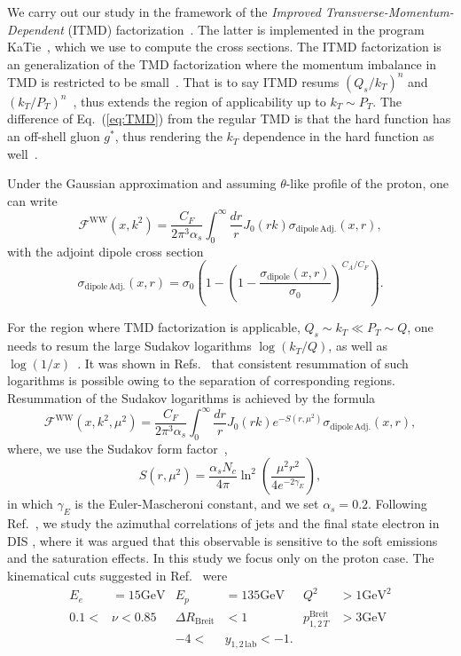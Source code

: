 \documentclass[11pt]{article}
\newcommand{\fww}[0]{\mathcal{F}^{\mathrm{WW}}}
\newcommand{\sdp}[0]{\sigma_{\mathrm{dipole}}}
\newcommand{\sdpa}[0]{\sigma_{\mathrm{dipole\,Adj.}}}
\newcommand{\GeV}[0]{\mathrm{GeV}}
\begin{document}
We carry out our study in the framework of the {\it Improved
Transverse-Momentum-Dependent} (ITMD)
factorization~\cite{Kotko:2015ura,vanHameren:2016ftb}.  The latter is
implemented in the program KaTie~\cite{vanHameren:2016kkz}, which we use to
compute the cross sections.  The ITMD factorization is an generalization of the
TMD factorization where the momentum
imbalance in TMD is restricted to be
small~\cite{Kotko:2015ura,vanHameren:2016ftb}. That is to say ITMD resums
$(Q_s/k_T)^n$ and $(k_T/P_T)^n$~\cite{Kotko:2015ura,vanHameren:2016ftb}, thus
extends the region of applicability up to $k_T\sim P_T$. The difference of
Eq.~(\ref{eq:TMD}) from the regular TMD is that the hard function has an
off-shell gluon $g^*$, thus rendering the $k_T$ dependence in the hard function
as well~\cite{Kotko:2015ura}.

Under the Gaussian approximation and assuming $\theta$-like profile of the
proton, one can
write~\cite{vanHameren:2016ftb,Xiao:2017ggh,Dominguez:2010xd,Dominguez:2011wm}
%
\begin{equation}
\fww(x,k^2)= \frac{C_F}{2\pi^3\alpha_s}\int^\infty_0\frac{dr}{r}J_0(r k) \sdpa(x,r),
\end{equation} 	
with the adjoint dipole cross section
\begin{equation}
\sdpa(x,r)=\sigma_0\left( 1-\left(1-\frac{\sdp(x,r)}{\sigma_0}\right)^{C_A/C_F}\right).
\label{eq:ww}
\end{equation}

For the region where TMD factorization is applicable, $Q_s\sim k_T\ll P_T\sim
Q$, one needs to resum the large Sudakov logarithms $\log(k_T/Q)$, as well as
$\log(1/x)$~\cite{Dominguez:2011wm}. It was shown in
Refs.~\cite{Mueller:2012uf,Mueller:2013wwa,Xiao:2017yya} that consistent
resummation of such logarithms is possible owing to the separation of
corresponding regions.  Resummation of the Sudakov logarithms is achieved by the
formula
%
\begin{equation}
	\fww(x,k^2,\mu^2)= \frac{C_F}{2\pi^3\alpha_s}\int^\infty_0\frac{dr}{r}J_0(r k) e^{-S(r,\mu^2)} \sdpa(x,r),
	\label{eq:ww-sud}
\end{equation}
%
where, we use the Sudakov form factor~\cite{Mueller:2013wwa,Xiao:2017yya},
%
\begin{equation}
	S(r,\mu^2)=\frac{\alpha_s N_c}{4\pi}\ln^2\left(\frac{\mu^2r^2}{4e^{-2\gamma_E}}\right),
\end{equation}
%
in which $\gamma_E$ is the Euler-Mascheroni constant, and we set $\alpha_s=0.2$. 
Following Ref.~\cite{vanHameren:2021sqc}, we study the azimuthal correlations of
jets and the final state electron in DIS , where
it was argued that this observable is sensitive to the soft emissions and the
saturation effects. In this study we focus only on the proton case.  The
kinematical cuts suggested in Ref.~\cite{vanHameren:2021sqc} were
%
\begin{align*}
	E_e&=15\GeV& E_p&=135\GeV& Q^2&>1\GeV^2\\
	0.1<&\nu<0.85&\Delta R_{\mathrm{Breit}}&<1&p^{\mathrm{Breit}}_{1,2\,T}&>3\GeV\\
	&&-4<&y_{1,2\,\mathrm{lab}}<-1.&&
\end{align*}
\end{document}
